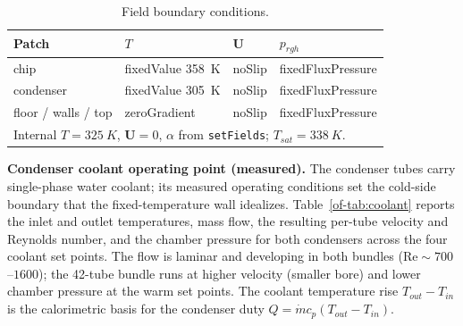 \documentclass[11pt]{article}
\begin{document}
\begin{table}[H]
\centering\caption{Field boundary conditions.}\label{of-tab:bc}
\begin{tabular}{llll}
\toprule
Patch & $T$ & $\mathbf U$ & $p_{rgh}$\\
\midrule
chip & fixedValue \SI{358}{K} & noSlip & fixedFluxPressure\\
condenser & fixedValue \SI{305}{K} & noSlip & fixedFluxPressure\\
floor / walls / top & zeroGradient & noSlip & fixedFluxPressure\\
\midrule
\multicolumn{4}{l}{Internal $T=\SI{325}{K}$, $\mathbf U=0$, $\alpha$ from
\texttt{setFields}; $T_{sat}=\SI{338}{K}$.}\\
\bottomrule
\end{tabular}
\end{table}

\noindent\textbf{Condenser coolant operating point (measured).} The condenser tubes
carry single-phase water coolant; its measured operating conditions set the cold-side
boundary that the fixed-temperature wall idealizes. Table~\ref{of-tab:coolant} reports the
inlet and outlet temperatures, mass flow, the resulting per-tube velocity and Reynolds
number, and the chamber pressure for both condensers across the four coolant set points.
The flow is laminar and developing in both bundles ($\mathrm{Re}\sim700$--$1600$); the
42-tube bundle runs at higher velocity (smaller bore) and lower chamber pressure at the
warm set points. The coolant temperature rise $T_{out}-T_{in}$ is the calorimetric basis
for the condenser duty $Q=\dot m c_p (T_{out}-T_{in})$.
\end{document}
